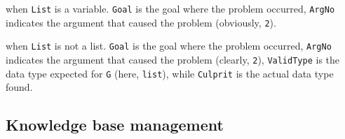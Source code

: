 \begin{itemize}

     when \texttt{List} is a variable. \texttt{Goal} is the goal where the problem occurred, \texttt{ArgNo} indicates the argument that caused the problem (obviously, \texttt{2}).

     when \texttt{List} is not a list. \texttt{Goal} is the goal where the problem occurred, \texttt{ArgNo} indicates the argument that caused the problem (clearly, \texttt{2}), \texttt{ValidType} is the data type expected for \texttt{G} (here, \texttt{list}), while \texttt{Culprit} is the actual data type found.

\end{itemize}

\subsection{Knowledge base management}
\label{ssec:knowledge-base-management}

